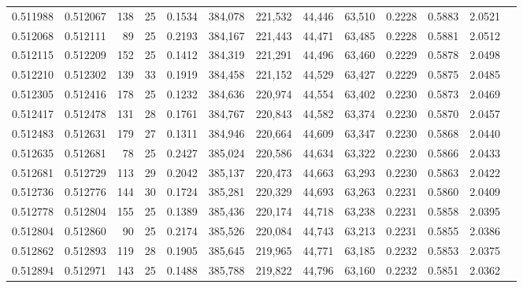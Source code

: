 \begin{tabular}{rrrrrrrrrrrrr}
0.511988 & 0.512067 & 138 &  25 &                                     0.1534 & 384,078 & 221,532 &  44,446 &  63,510 & 0.2228 & 0.5883 & 2.0521 \\
0.512068 & 0.512111 &  89 &  25 &                                     0.2193 & 384,167 & 221,443 &  44,471 &  63,485 & 0.2228 & 0.5881 & 2.0512 \\
0.512115 & 0.512209 & 152 &  25 &                                     0.1412 & 384,319 & 221,291 &  44,496 &  63,460 & 0.2229 & 0.5878 & 2.0498 \\
0.512210 & 0.512302 & 139 &  33 &                                     0.1919 & 384,458 & 221,152 &  44,529 &  63,427 & 0.2229 & 0.5875 & 2.0485 \\
0.512305 & 0.512416 & 178 &  25 &                                     0.1232 & 384,636 & 220,974 &  44,554 &  63,402 & 0.2230 & 0.5873 & 2.0469 \\
0.512417 & 0.512478 & 131 &  28 &                                     0.1761 & 384,767 & 220,843 &  44,582 &  63,374 & 0.2230 & 0.5870 & 2.0457 \\
0.512483 & 0.512631 & 179 &  27 &                                     0.1311 & 384,946 & 220,664 &  44,609 &  63,347 & 0.2230 & 0.5868 & 2.0440 \\
0.512635 & 0.512681 &  78 &  25 &                                     0.2427 & 385,024 & 220,586 &  44,634 &  63,322 & 0.2230 & 0.5866 & 2.0433 \\
0.512681 & 0.512729 & 113 &  29 &                                     0.2042 & 385,137 & 220,473 &  44,663 &  63,293 & 0.2230 & 0.5863 & 2.0422 \\
0.512736 & 0.512776 & 144 &  30 &                                     0.1724 & 385,281 & 220,329 &  44,693 &  63,263 & 0.2231 & 0.5860 & 2.0409 \\
0.512778 & 0.512804 & 155 &  25 &                                     0.1389 & 385,436 & 220,174 &  44,718 &  63,238 & 0.2231 & 0.5858 & 2.0395 \\
0.512804 & 0.512860 &  90 &  25 &                                     0.2174 & 385,526 & 220,084 &  44,743 &  63,213 & 0.2231 & 0.5855 & 2.0386 \\
0.512862 & 0.512893 & 119 &  28 &                                     0.1905 & 385,645 & 219,965 &  44,771 &  63,185 & 0.2232 & 0.5853 & 2.0375 \\
0.512894 & 0.512971 & 143 &  25 &                                     0.1488 & 385,788 & 219,822 &  44,796 &  63,160 & 0.2232 & 0.5851 & 2.0362 \\

\end{tabular}
